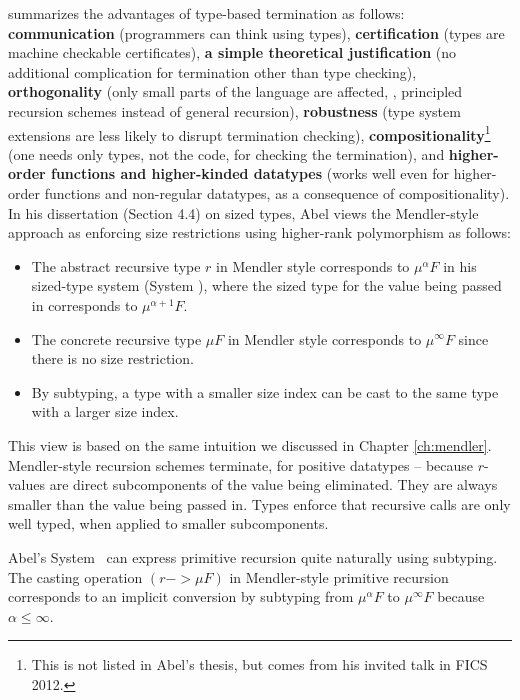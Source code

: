 \citet{abel06phd,Abel12talkFICS} summarizes the advantages of
type-based termination as follows:
\textbf{communication} (programmers can think using types),
\textbf{certification} (types are machine checkable certificates),
\textbf{a simple theoretical justification}
        (no additional complication for termination other than type checking),
\textbf{orthogonality} (only small parts of the language are affected,
        \eg, principled recursion schemes instead of general recursion),
\textbf{robustness} (type system extensions are less likely to
                        disrupt termination checking),
\textbf{compositionality}\footnote{This is not listed in Abel's thesis,
                                but comes from his invited talk in FICS 2012.}
        (one needs only types, not the code, for checking the termination), and
\textbf{higher-order functions and higher-kinded datatypes}
        (works well even for higher-order functions and non-regular datatypes,
        as a consequence of compositionality).
In his dissertation \cite{abel06phd} (Section 4.4) on sized types,
Abel views the Mendler-style approach as enforcing size restrictions
using higher-rank polymorphism as follows:
\begin{itemize}
\item The abstract recursive type $r$ in Mendler style corresponds to
        $\mu^\alpha F$ in his sized-type system (System \Fwhat),
        where the sized type
        for the value being passed in corresponds to $\mu^{\alpha+1} F$.
\item The concrete recursive type $\mu F$ in Mendler style corresponds to
        $\mu^\infty F$ since there is no size restriction.
\item By subtyping, a type with a smaller size index can be cast to
        the same type with a larger size index.
\end{itemize}
This view is based on the same intuition we discussed in
Chapter \ref{ch:mendler}. Mendler-style recursion schemes terminate, for
positive datatypes -- because $r$-values are direct subcomponents
of the value being eliminated. They are always smaller
than the value being passed in. Types enforce that recursive calls
are only well typed, when applied to smaller subcomponents.

Abel's System \Fwhat\ can express primitive recursion quite naturally
using subtyping. The casting operation $(r -> \mu F)$ in Mendler-style
primitive recursion corresponds to an implicit conversion by subtyping
from $\mu^\alpha F$ to $\mu^\infty F$ because $\alpha \leq \infty$.

